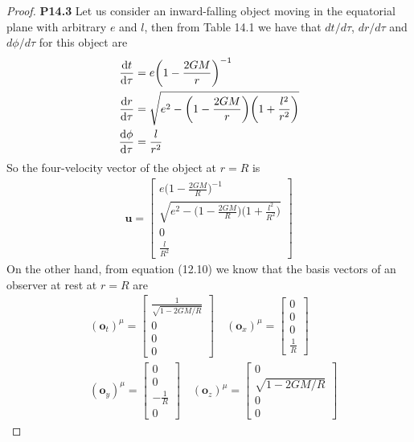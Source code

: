 \documentclass[11pt]{article}
\theoremstyle{definition}
\begin{document}
\cleardoublepage
\begin{proof}{\textbf{P14.3}}
Let us consider an inward-falling object moving in the equatorial plane with
arbitrary $e$ and $l$, then from Table 14.1 we have that $dt/d\tau$, $dr/d\tau$
and $d\phi/d\tau$ for this object are
\begin{align*}
    \dv{t}{\tau} &= e\bigg(1 - \frac{2GM}{r}\bigg)^{-1}\\
    \dv{r}{\tau} &= \sqrt{
        e^2 - \bigg(1 - \frac{2GM}{r}\bigg)\bigg(1 + \frac{l^2}{r^2}\bigg)
    }\\
    \dv{\phi}{\tau} &= \frac{l}{r^2}
\end{align*}
So the four-velocity vector of the object at $r = R$ is
\begin{align*}
    \bm{u} = \begin{bmatrix}
        e\bigg(1 - \frac{2GM}{R}\bigg)^{-1}\\[11pt]
        \sqrt{e^2 - \bigg(1 - \frac{2GM}{R}\bigg)\bigg(1 + \frac{l^2}{R^2}\bigg)}\\[11pt]
        0\\[11pt]
        \frac{l}{R^2}
    \end{bmatrix}
\end{align*}
On the other hand, from equation (12.10) we know that the basis vectors
of an observer at rest at $r = R$ are
\begin{align*}
    &(\bm{o}_t)^\mu = \begin{bmatrix}
        \frac{1}{\sqrt{1 - 2GM/R}}\\ 0\\ 0 \\ 0
    \end{bmatrix}
    \quad (\bm{o}_x)^\mu = \begin{bmatrix}
        0\\ 0\\ 0 \\ \frac{1}{R}
    \end{bmatrix}\\
    &(\bm{o}_y)^\mu = \begin{bmatrix}
        0\\ 0\\ -\frac{1}{R} \\ 0
    \end{bmatrix}
    \quad (\bm{o}_z)^\mu = \begin{bmatrix}
        0\\ \sqrt{1 - 2GM/R}\\ 0 \\ 0

\end{bmatrix}
\end{align*}
\end{proof}
\end{document}
